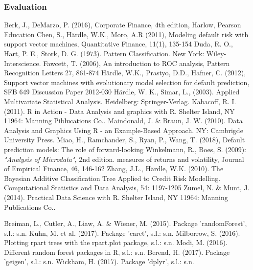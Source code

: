 \documentclass{article}
\begin{document}
\subsubsection{Evaluation}


\begin{thebibliography}{9}
  Berk, J., DeMarzo, P. (2016), Corporate Finance, 4th edition, Harlow, Pearson Education 
  Chen, S., H{\"a}rdle, W.K., Moro, A.R (2011), Modeling default risk with support vector machines,  Quantitative Finance, 11(1), 135-154
Duda, R. O., Hart, P. E., Stork, D. G. (1973). Pattern Classification. New York: Wiley-Interscience.
  Fawcett, T. (2006), An introduction to ROC analysis, Pattern Recognition Letters 27, 861-874
  H{\"a}rdle, W.K., Prastyo, D.D., Hafner, C. (2012), Support vector machines with evolutionary model selection for default prediction, SFB 649 Discussion Paper 2012-030
H{\"a}rdle, W. K., Simar, L., (2003). Applied Multivariate Statistical Analysis. Heidelberg: Springer-Verlag.
Kabacoff, R. I. (2011). R in Action - Data Analysis and graphics with R. Shelter Island, NY 11964: Manning Piblucations Co..
Maindonald, J. \& Braun, J. W. (2010). Data Analysis and Graphics Using R - an Example-Based Approach. NY: Cambrigde University Press.
  Miao, H., Ramchander, S., Ryan, P., Wang, T. (2018), Default prediction models: The role of forward-looking 
  Winkelmann, R., Boes, S. (2009): \textit{"Analysis of Microdata"}, 2nd edition.
measures of returns and volatility, Journal of Empirical Finance, 46, 146-162
  Zhang, J.L., H{\"a}rdle, W.K. (2010). The Bayesian Additive Classification Tree Applied to Credit Risk Modelling. Computational Statistics and Data Analysis, 54: 1197-1205 
Zumel, N. \& Munt, J. (2014). Practical Data Science with R. Shelter Island, NY 11964: Manning Publications Co..

Breiman, L., Cutler, A., Liaw, A. \& Wiener, M. (2015). Package 'randomForest', s.l.: s.n.
Kuhn, M. et al. (2017). Package 'caret', s.l.: s.n.
Milborrow, S. (2016). Plotting rpart trees with the rpart.plot package, s.l.: s.n.
Modi, M. (2016). Different random forest packages in R, s.l.: s.n.
Berend, H. (2017). Package 'geigen', s.l.: s.n.
Wickham, H. (2017). Package 'dplyr', s.l.: s.n.


\end{thebibliography}
\end{document}
